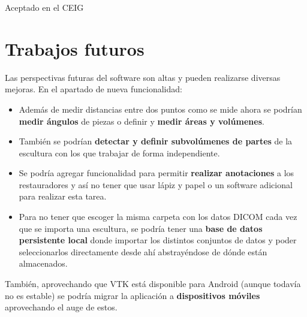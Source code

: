 Aceptado en el CEIG

\section{Trabajos futuros}

Las perspectivas futuras del software son altas y pueden realizarse diversas mejoras. En el apartado de nueva funcionalidad:

\begin{itemize}
	\item Además de medir distancias entre dos puntos como se mide ahora se podrían \textbf{medir ángulos} de piezas o definir y \textbf{medir áreas y volúmenes}.
	\item También se podrían \textbf{detectar y definir subvolúmenes de partes} de la escultura con los que trabajar de forma independiente.
	\item Se podría agregar funcionalidad para permitir \textbf{realizar anotaciones} a los restauradores y así no tener que usar lápiz y papel o un software adicional para realizar esta tarea.
	\item Para no tener que escoger la misma carpeta con los datos DICOM cada vez que se importa una escultura, se podría tener una \textbf{base de datos persistente local} donde importar los distintos conjuntos de datos y poder seleccionarlos directamente desde ahí abstrayéndose de dónde están almacenados.
\end{itemize}

También, aprovechando que VTK está disponible para Android (aunque todavía no es estable) se podría migrar la aplicación a \textbf{dispositivos móviles} aprovechando el auge de estos.